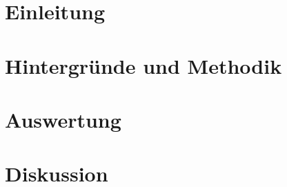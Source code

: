 \documentclass[a4paper,11pt,twoside,onecolumn,openright,final]{memoir} %
\begin{document}
\frontmatter




\newpage
\thispagestyle{empty}
\quad
\newpage
\thispagestyle{empty}
\tableofcontents  %
\listoffigures    %
\listoftables     %
\newpage

\mainmatter %



\part{Einleitung}


\part{Hintergründe und Methodik}



\part{Auswertung}




\part{Diskussion}





\end{document}
